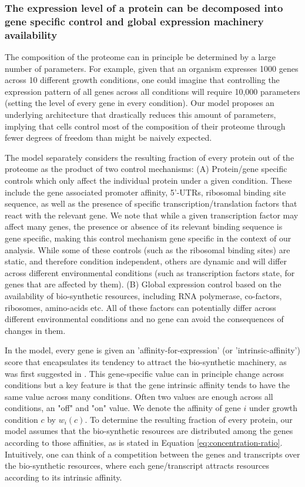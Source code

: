 \documentclass{article}
\begin{document}
\subsubsection{The expression level of a protein can be decomposed into gene specific control and global
expression machinery availability}
The composition of the proteome can in principle be determined by a large number of parameters.
For example, given that an organism expresses 1000 genes across 10 different growth conditions, one could imagine that controlling the expression pattern of all genes across all conditions will require 10,000 parameters (setting the level of every gene in every condition).
Our model proposes an underlying architecture that drastically reduces this amount of parameters, implying that cells control most of the composition of their proteome through fewer degrees of freedom than might be naively expected.

The model separately considers the resulting fraction of every protein out of the proteome as the product of two control mechanisms:
(A) Protein/gene specific controls which only affect the individual protein under a given condition.
These include the gene associated promoter affinity, 5'-UTRs, ribosomal binding site sequence, as well as the presence of specific transcription/translation factors that react with the relevant gene.
We note that while a given transcription factor may affect many genes, the presence or absence of its relevant binding sequence is gene specific, making this control mechanism gene specific in the context of our analysis.
  While some of these controls (such as the ribosomal binding sites) are static, and therefore condition independent, others are dynamic and will differ across different environmental conditions (such as transcription factors state, for genes that are affected by them).
(B) Global expression control based on the availability of bio-synthetic resources, including RNA polymerase, co-factors, ribosomes, amino-acids etc.
  All of these factors can potentially differ across different environmental conditions and no gene can avoid the consequences of changes in them.

In the model, every gene is given an 'affinity-for-expression' (or 'intrinsic-affinity') score that encapsulates its tendency to attract the bio-synthetic machinery, as was first suggested in \cite{Maaloe1969}.
This gene-specific value can in principle change across conditions but a key feature is that the gene intrinsic affinity tends to have the same value across many conditions.
Often two values are enough across all conditions, an "off" and "on" value.
We denote the affinity of gene $i$ under growth condition $c$ by $w_i(c)$.
To determine the resulting fraction of every protein, our model assumes that the bio-synthetic resources are distributed among the genes according to those affinities, as is stated in Equation \ref{eq:concentration-ratio}.
Intuitively, one can think of a competition between the genes and transcripts over the bio-synthetic resources, where each gene/transcript attracts resources according to its intrinsic affinity.
\end{document}
